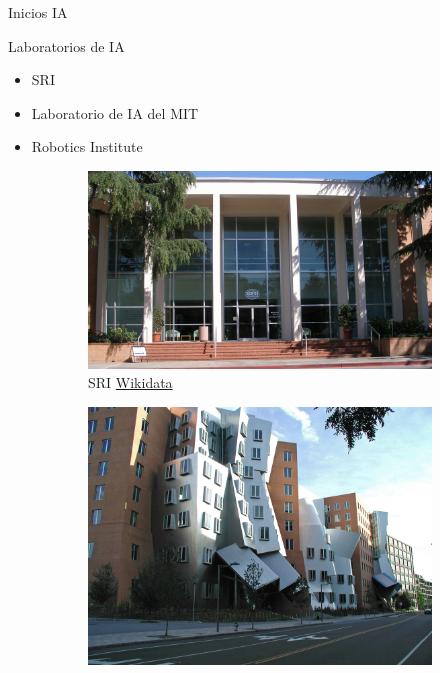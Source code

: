 \begin{frame}[fragile]{Inicios IA}
	\vspace{10px}
	\pause
	\begin{block}{Laboratorios de IA}
		\begin{itemize}
			\item SRI
			\pause
			\item Laboratorio de IA del MIT
			\pause
			\item Robotics Institute
		\end{itemize}
	\end{block}
	\begin{figure}
		\centering
		\begin{subfigure}{0.25\textwidth}
			\centering
			\includegraphics[scale=0.04]{./EtapaModerna/Imagenes/sri.jpg}
			\caption{SRI \href{https://es.m.wikipedia.org/wiki/Archivo:SRI_International_HQ.jpg}{Wikidata}}
		\end{subfigure}
		\begin{subfigure}{0.25\textwidth}
			\centering
			\includegraphics[scale=0.04]{./EtapaModerna/Imagenes/mit_ai.jpg}

\end{subfigure}
\end{figure}
\end{frame}
